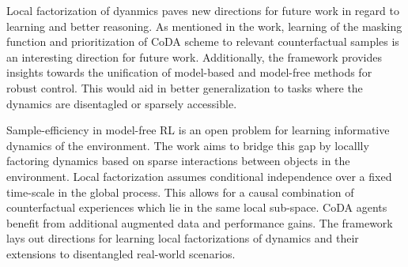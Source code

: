 \documentclass[11pt,letterpaper]{article}
\begin{document}
Local factorization of dyanmics paves new directions for future work in regard to learning and better reasoning. As mentioned in the work, learning of the masking function and prioritization of CoDA scheme to relevant counterfactual samples is an interesting direction for future work. Additionally, the framework provides insights towards the unification of model-based and model-free methods for robust control. This would aid in better generalization to tasks where the dynamics are disentagled or sparsely accessible. 

Sample-efficiency in model-free RL is an open problem for learning informative dynamics of the environment. The work aims to bridge this gap by locallly factoring dynamics based on sparse interactions between objects in the environment. Local factorization assumes conditional independence over a fixed time-scale in the global process. This allows for a causal combination of counterfactual experiences which lie in the same local sub-space. CoDA agents benefit from additional augmented data and performance gains. The framework lays out directions for learning local factorizations of dynamics and their extensions to disentangled real-world scenarios. 
\end{document}
